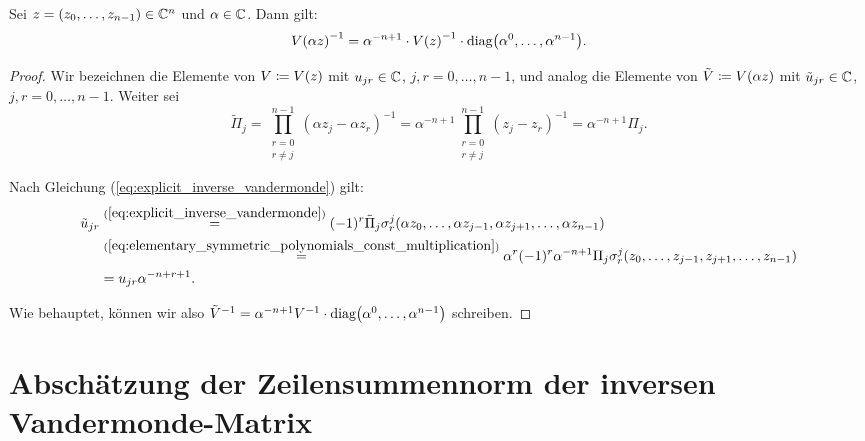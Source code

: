 \begin{lemma}
    \label{lemma:inverse_vandermonde_const_multiplication}
    Sei $z = (z_0, \dots, z_{n-1}) \in \mathbb{C}^n$ und $\alpha \in \mathbb{C}$.
    Dann gilt:
    \begin{equation}
        \label{eq:inverse_vandermonde_const_multiplication}
        \text{$V(\alpha z)$}^{-1}
        = \alpha^{-n+1} \cdot \text{$V(z)$}^{-1} \cdot \text{diag$ \left( \alpha^0, \dots, \alpha^{n-1} \right)$}.
    \end{equation}
\end{lemma}

\begin{proof}
    Wir bezeichnen die Elemente von
    $V \coloneqq \text{$V(z)$}$ mit $u_{jr} \in \mathbb{C}$, $j,r = 0, \dots, n-1$,
    und analog die Elemente von
    $\tilde{V} \coloneqq \text{$V(\alpha z)$}$ mit
    $\tilde{u}_{jr} \in \mathbb{C}$, $j,r = 0, \dots, n-1$.
    Weiter sei
    \[
        \tilde{\Pi}_j
        = \prod_{\substack{r=0\\ r \neq j}}^{n-1} \left( \alpha z_j - \alpha z_r \right)^{-1}
        = \alpha^{-n+1} \prod_{\substack{r=0\\ r \neq j}}^{n-1} \left( z_j - z_r \right)^{-1}
        = \alpha^{-n+1} \Pi_j.
    \]

    \noindent Nach Gleichung (\ref{eq:explicit_inverse_vandermonde}) gilt:
    \begin{equation}
        \label{eq:inverse_vandermonde_const_multiplication}
        \begin{split}
            \tilde{u}_{jr}
            &\overset{(\ref{eq:explicit_inverse_vandermonde})}{=}
                (-1)^{r} \tilde{\Pi}_j \sigma_{r}^{j}(\alpha z_0, \dots, \alpha z_{j-1}, \alpha z_{j+1}, \dots, \alpha z_{n-1})\\
            &\overset{(\ref{eq:elementary_symmetric_polynomials_const_multiplication})}{=}
                \alpha^{r} (-1)^{r} \alpha^{-n+1} \Pi_j \sigma_{r}^{j}(z_0, \dots, z_{j-1}, z_{j+1}, \dots, z_{n-1})\\
            &= u_{jr} \alpha^{-n+r+1}.
        \end{split}
    \end{equation}

    \noindent Wie behauptet, können wir also
    $\tilde{V}^{-1} = \alpha^{-n+1} V^{-1} \cdot \text{diag$ \left( \alpha^{0}, \dots, \alpha^{n-1} \right)$}$ schreiben.

\end{proof}

\section{Abschätzung der Zeilensummennorm der inversen Vandermonde-Matrix}

